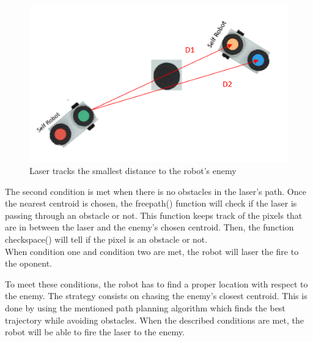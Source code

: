 \begin{figure}[thb]
    \centering
    \includegraphics[width=1\textwidth]{images/laser_track.png}
    \caption[laser tracking]{Laser tracks the smallest distance to the robot's enemy}\label{laser_track}
\end{figure}

The second condition is met when there is no obstacles in the laser's path. Once the nearest centroid is chosen, the freepath() function will check if the laser is passing through an obstacle or not. This function keeps track of the pixels that are in between the laser and the enemy's chosen centroid. Then, the function checkspace() will tell if the pixel is an obstacle or not.\\
When condition one and condition two are met, the robot will laser the fire to the oponent.

To meet these conditions, the robot has to find a proper location with respect to the enemy. The strategy consists on chasing the enemy's closest centroid. This is done by using the mentioned path planning algorithm which finds the best trajectory while avoiding obstacles. When the described conditions are met, the robot will be able to fire the laser to the enemy.

